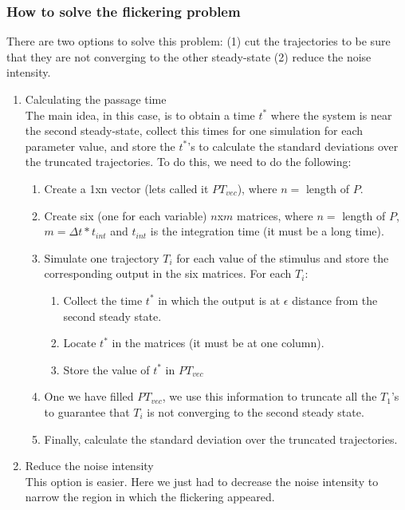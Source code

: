 \documentclass[12pt,twoside]{book}
\begin{document}
\subsubsection*{How to solve the flickering problem}

There are two options to solve this problem: (1) cut the trajectories to be sure that they are not converging to the other steady-state (2) reduce the noise intensity. \\

\begin{enumerate}
\item Calculating the passage time\\

The main idea, in this case, is to obtain a time $t^*$ where the system is near the second steady-state, collect this times for one simulation for each parameter value, and store the $t^*$'s to calculate the standard deviations over the truncated trajectories. To do this, we need to do the following:
	
	\begin{enumerate}
	\item Create a 1xn vector (lets called it $PT_{vec}			$), where $n=$ length of $P$.
	\item Create six (one for each variable) $n$x$m$ 			matrices, where $n=$ length of $P$, $m=						\Delta t*t_{int}$ and $t_{int}$ is the integration 			time (it must be a long time).
	\item Simulate one trajectory $T_i$ for each value 			of the stimulus and store the corresponding output 			in the six matrices. For each $T_i$:\\
		\begin{enumerate}
		\item Collect the time $t^*$ in which the output 		is at $\epsilon$ distance from the second 					steady state.
		\item  Locate $t^*$ in the matrices (it must be 			at one column).
		\item Store the value of $t^*$ in $PT_{vec}$
		\end{enumerate}
	\item One we have filled $PT_{vec}$, we use this 			information to truncate all the $T_1$'s to guarantee 	that $T_i$ is not converging to the second steady 			state. 
	\item Finally, calculate the standard deviation over 	the truncated trajectories. 
	\end{enumerate}

\item Reduce the noise intensity\\

	This option is easier. Here we just had to decrease the noise intensity to narrow the region in which the flickering appeared. 

\end{enumerate} 
\end{document}
